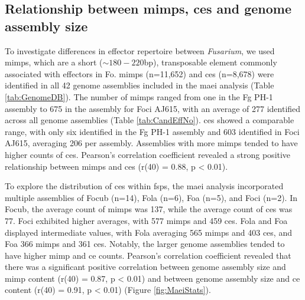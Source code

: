 \subsection{Relationship between \acp{mimp}, \acp{ce} and genome assembly size}


To investigate differences in effector repertoire between \textit{Fusarium}, we used \acp{mimp}, which are a short ($\sim180 - 220$bp), transposable element commonly associated with effectors in \ac{Fo}. \Acp{mimp} (n=11,652) and \acfp{ce} (n=8,678) were identified in all 42 genome assemblies included in the \ac{maei} analysis (Table \ref{tab:GenomeDB}). The number of \acp{mimp} ranged from one in the \ac{Fg} PH-1 assembly to 675 in the assembly for \ac{Foci} AJ615, with an average of 277 identified across all genome assemblies (Table \ref{tab:CandEffNo}). \Acp{ce} showed a comparable range, with only six identified in the \ac{Fg} PH-1 assembly and 603 identified in \ac{Foci} AJ615, averaging 206 per assembly. Assemblies with more \acp{mimp} tended to have higher counts of \acp{ce}. Pearson's correlation coefficient revealed a strong positive relationship between \acp{mimp} and \acp{ce} (r(40) = 0.88, p < 0.01). 



To explore the distribution of \acp{ce} within \acp{fsp}, the \ac{maei} analysis incorporated multiple assemblies of \ac{Focub} (n=14), \ac{Fola} (n=6), \ac{Foa} (n=5), and \ac{Foci} (n=2). In \ac{Focub}, the average count of \acp{mimp} was 137, while the average count of \acp{ce} was 77. \ac{Foci} exhibited higher averages, with 577 \acp{mimp} and 459 \acp{ce}. \ac{Fola} and \ac{Foa} displayed intermediate values, with \ac{Fola} averaging 565 \acp{mimp} and 403 \acp{ce}, and \ac{Foa} 366 \acp{mimp} and 361 \acp{ce}. Notably, the larger genome assemblies tended to have higher \ac{mimp} and \ac{ce} counts. Pearson's correlation coefficient revealed that there was a significant positive correlation between genome assembly size and \ac{mimp} content (r(40) = 0.87, p < 0.01) and between genome assembly size and \ac{ce} content (r(40) = 0.91, p < 0.01) (Figure \ref{fig:MaeiStats}). 

